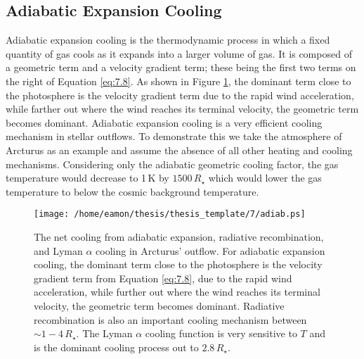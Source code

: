 \subsection{Adiabatic Expansion Cooling}\label{sec:7.3.1}
Adiabatic expansion cooling is the thermodynamic process in which a fixed quantity of gas cools as it expands into a larger volume of gas. It is composed of a geometric term and a velocity gradient term; these being the first two terms on the right of Equation \ref{eq:7.8}. As shown in Figure \ref{fig:7.1}, the dominant term close to the photosphere is the velocity gradient term due to the rapid wind acceleration, while farther out where the wind reaches its terminal velocity, the geometric term becomes dominant. Adiabatic expansion cooling is a very efficient cooling mechanism in stellar outflows. To demonstrate this we take the atmosphere of Arcturus as an example and assume the absence of all other heating and cooling mechanisms. Considering only the adiabatic geometric cooling factor, the gas temperature would decrease to 1\,K by $1500\,R_{\star}$ which would lower the gas temperature to below the cosmic background temperature. 

\begin{figure}[!ht]
\centering 
         \texttt{[image: /home/eamon/thesis/thesis\_template/7/adiab.ps]}
\caption[Various cooling mechanisms in Arcturus' wind]{The net cooling from adiabatic expansion, radiative recombination, and Lyman $\alpha$ cooling in Arcturus' outflow. For adiabatic expansion cooling, the dominant term close to the photosphere is the velocity gradient term from Equation \ref{eq:7.8}, due to the rapid wind acceleration, while further out where the wind reaches its terminal velocity, the geometric term becomes dominant. Radiative recombination is also an important cooling mechanism between $\sim 1-4\,R_{\star}$. The Lyman $\alpha$ cooling function is very sensitive to $T$ and is the dominant cooling process out to $2.8\,R_{\star}$.}
\label{fig:7.1}
\end{figure}

